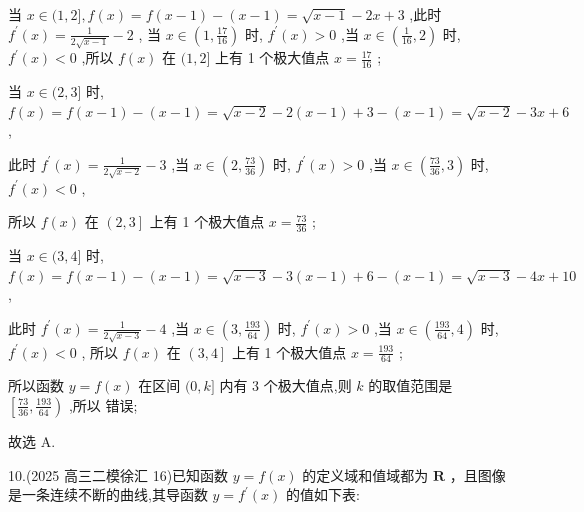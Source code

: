 \documentclass[10pt]{article}
\newcommand*\circled[1]{\tikz[baseline=(char.base)]{\node[shape=circle,draw,inner sep=1.5pt] (char) {\small #1};}}
\begin{document}
当 \(x \in  (1,2\rbrack ,f\left( x\right)  = f\left( {x - 1}\right)  - \left( {x - 1}\right)  = \sqrt{x - 1} - {2x} + 3\) ,此时 \({f}^{\prime }\left( x\right)  = \frac{1}{2\sqrt{x - 1}} - 2\) , 当 \(x \in  \left( {1,\frac{17}{16}}\right)\) 时, \({f}^{\prime }\left( x\right)  > 0\) ,当 \(x \in  \left( {\frac{1}{16},2}\right)\) 时, \({f}^{\prime }\left( x\right)  < 0\) ,所以 \(f\left( x\right)\) 在 \((1,2\rbrack\) 上有 1 个极大值点 \(x = \frac{17}{16}\) ;

当 \(x \in  (2,3\rbrack\) 时, \(f\left( x\right)  = f\left( {x - 1}\right)  - \left( {x - 1}\right)  = \sqrt{x - 2} - 2\left( {x - 1}\right)  + 3 - \left( {x - 1}\right)  = \sqrt{x - 2} - {3x} + 6\) ,

此时 \({f}^{\prime }\left( x\right)  = \frac{1}{2\sqrt{x - 2}} - 3\) ,当 \(x \in  \left( {2,\frac{73}{36}}\right)\) 时, \({f}^{\prime }\left( x\right)  > 0\) ,当 \(x \in  \left( {\frac{73}{36},3}\right)\) 时, \({f}^{\prime }\left( x\right)  < 0\) ,

所以 \(f\left( x\right)\) 在 \(\left( {2,3}\right\rbrack\) 上有 1 个极大值点 \(x = \frac{73}{36}\) ;

当 \(x \in  (3,4\rbrack\) 时, \(f\left( x\right)  = f\left( {x - 1}\right)  - \left( {x - 1}\right)  = \sqrt{x - 3} - 3\left( {x - 1}\right)  + 6 - \left( {x - 1}\right)  = \sqrt{x - 3} - {4x} + {10}\) ,

此时 \({f}^{\prime }\left( x\right)  = \frac{1}{2\sqrt{x - 3}} - 4\) ,当 \(x \in  \left( {3,\frac{193}{64}}\right)\) 时, \({f}^{\prime }\left( x\right)  > 0\) ,当 \(x \in  \left( {\frac{193}{64},4}\right)\) 时, \({f}^{\prime }\left( x\right)  < 0\) , 所以 \(f\left( x\right)\) 在 \(\left( {3,4}\right\rbrack\) 上有 1 个极大值点 \(x = \frac{193}{64}\) ;

所以函数 \(y = f\left( x\right)\) 在区间 \((0,k\rbrack\) 内有 3 个极大值点,则 \(k\) 的取值范围是 \(\left\lbrack  {\frac{73}{36},\frac{193}{64}}\right)\) ,所以  \circled{2} 错误;

故选 A.

10.(2025 高三二模徐汇 16)已知函数 \(y = f\left( x\right)\) 的定义域和值域都为 \(\mathbf{R}\) ，且图像是一条连续不断的曲线,其导函数 \(y = {f}^{\prime }\left( x\right)\) 的值如下表:

\begin{center}
\end{center}
\end{document}
